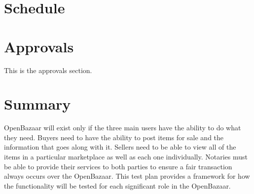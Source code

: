 \documentclass{article}
\begin{document}
\section*{Schedule}


\section*{Approvals}
This is the approvals section.

\section*{Summary}
OpenBazaar will exist only if the three main users have the ability to do what they need.
Buyers need to have the ability to post items for sale and the information that goes along with it.
Sellers need to be able to view all of the items in a particular marketplace as well as each one individually.
Notaries must be able to provide their services to both parties to ensure a fair transaction always occurs over the OpenBazaar.
This test plan provides a framework for how the functionality will be tested for each significant role in the OpenBazaar.
\end{document}
